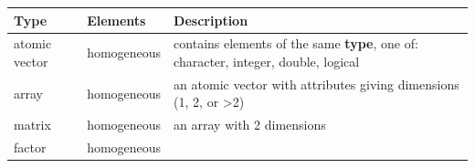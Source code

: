 \documentclass[]{book}
\begin{document}
\begin{longtable}[]{@{}lll@{}}
\toprule
\begin{minipage}[b]{0.10\columnwidth}\raggedright
Type\strut
\end{minipage} & \begin{minipage}[b]{0.10\columnwidth}\raggedright
Elements\strut
\end{minipage} & \begin{minipage}[b]{0.71\columnwidth}\raggedright
Description\strut
\end{minipage}\tabularnewline
\midrule
\endhead
\begin{minipage}[t]{0.10\columnwidth}\raggedright
atomic vector\strut
\end{minipage} & \begin{minipage}[t]{0.10\columnwidth}\raggedright
homogeneous\strut
\end{minipage} & \begin{minipage}[t]{0.71\columnwidth}\raggedright
contains elements of the same \textbf{type}, one of: character, integer, double, logical\strut
\end{minipage}\tabularnewline
\begin{minipage}[t]{0.10\columnwidth}\raggedright
array\strut
\end{minipage} & \begin{minipage}[t]{0.10\columnwidth}\raggedright
homogeneous\strut
\end{minipage} & \begin{minipage}[t]{0.71\columnwidth}\raggedright
an atomic vector with attributes giving dimensions (1, 2, or \textgreater{}2)\strut
\end{minipage}\tabularnewline
\begin{minipage}[t]{0.10\columnwidth}\raggedright
matrix\strut
\end{minipage} & \begin{minipage}[t]{0.10\columnwidth}\raggedright
homogeneous\strut
\end{minipage} & \begin{minipage}[t]{0.71\columnwidth}\raggedright
an array with 2 dimensions\strut
\end{minipage}\tabularnewline
\begin{minipage}[t]{0.10\columnwidth}\raggedright
factor\strut
\end{minipage} & \begin{minipage}[t]{0.10\columnwidth}\raggedright
homogeneous\strut
\end{minipage} & \begin{minipage}[t]{0.71\columnwidth}\raggedright

\end{minipage}
\end{longtable}
\end{document}

